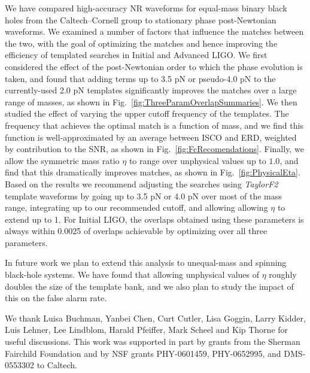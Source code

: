 We have compared high-accuracy NR waveforms for equal-mass binary
black holes from the Caltech--Cornell group to stationary phase
post-Newtonian waveforms.  We examined a number of factors that
influence the matches between the two, with the goal of optimizing the
matches and hence improving the efficiency of templated searches in
Initial and Advanced LIGO.  We first considered the effect of the
post-Newtonian order to which the phase evolution is taken, and found
that adding terms up to 3.5 pN or pseudo-4.0 pN to the currently-used
2.0 pN templates significantly improves the matches over a large range
of masses, as shown in Fig.~\ref{fig:ThreeParamOverlapSummaries}.  We
then studied the effect of varying the upper cutoff frequency of the
templates.  The frequency that achieves the optimal match is a
function of mass, and we find this function is well-approximated by an
average between ISCO and ERD, weighted by contribution to the SNR, as
shown in Fig.~\ref{fig:FcRecomendations}.  Finally, we allow the
symmetric mass ratio $\eta$ to range over unphysical values up to
$1.0$, and find that this dramatically improves matches, as shown in
Fig.~\ref{fig:PhysicalEta}.  Based on the results we recommend
adjusting the searches using \textit{TaylorF2} template waveforms by
going up to 3.5 pN or 4.0 pN over most of the mass range, integrating
up to our recommended cutoff, and allowing allowing $\eta$ to extend
up to 1.  For Initial LIGO, the overlaps obtained using these
parameters is always within 0.0025 of overlaps achievable by
optimizing over all three parameters.

In future work we plan to extend this analysis to unequal-mass and
spinning black-hole systems.  We have found that allowing unphysical
values of $\eta$ roughly doubles the size of the template bank, and we
also plan to study the impact of this on the false alarm rate.




\newpage
  We thank Luisa Buchman, Yanbei Chen, Curt Cutler, Lisa Goggin, Larry
  Kidder, Luis Lehner, Lee Lindblom, Harald Pfeiffer, Mark Scheel and
  Kip Thorne for useful discussions.  This work was supported in part
  by grants from the Sherman Fairchild Foundation and by NSF grants
  PHY-0601459, PHY-0652995, and DMS-0553302 to Caltech.

